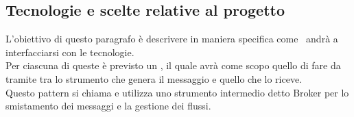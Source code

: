 %
%

\subsection{Tecnologie e scelte relative al progetto}
	L'obiettivo di questo paragrafo è descrivere in maniera specifica come \progetto\ andrà a interfacciarsi con le tecnologie.\\
	Per ciascuna di queste è previsto un , il quale avrà come scopo quello di fare da tramite tra lo strumento che genera il messaggio e quello che lo riceve.\\
	Questo pattern si chiama  e utilizza uno strumento intermedio detto Broker per lo smistamento dei messaggi e la gestione dei flussi.


